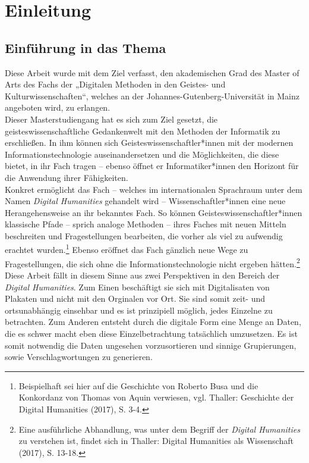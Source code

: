 \documentclass[a4paper,12pt,ngerman]{article}
\begin{document}
\newpage

\thispagestyle{empty}
\tableofcontents

\newpage

\section{Einleitung}
\subsection{Einführung in das Thema}
Diese Arbeit wurde mit dem Ziel verfasst, den akademischen Grad des Master of Arts des Fachs der „Digitalen Methoden in den Geistes- und Kulturwissenschaften“, welches an der Johannes-Gutenberg-Universität in Mainz angeboten wird, zu erlangen. \\
Dieser Masterstudiengang hat es sich zum Ziel gesetzt, die geisteswissenschaftliche Gedankenwelt mit den Methoden der Informatik zu erschließen. In ihm können sich Geisteswissenschaftler*innen mit der modernen Informationstechnologie auseinandersetzen und die Möglichkeiten, die diese bietet, in ihr Fach tragen -- ebenso öffnet er Informatiker*innen den Horizont für die Anwendung ihrer Fähigkeiten. \\
Konkret ermöglicht das Fach -- welches im internationalen Sprachraum unter dem Namen \textit{Digital Humanities} gehandelt wird -- Wissenschaftler*innen eine neue Herangehensweise an ihr bekanntes Fach.  So können Geisteswissenschaftler*innen klassische Pfade -- sprich analoge Methoden -- ihres Faches mit neuen Mitteln beschreiten und Fragestellungen bearbeiten, die vorher als viel zu aufwendig erachtet wurden.\footnote{Beispielhaft sei hier auf die Geschichte von Roberto Busa und die Konkordanz von Thomas von Aquin verwiesen, vgl. Thaller: Geschichte der Digital Humanities (2017), S. 3-4.} Ebenso eröffnet das Fach gänzlich neue Wege zu Fragestellungen, die sich ohne die Informationstechnologie nicht ergeben hätten.\footnote{Eine ausführliche Abhandlung, was unter dem Begriff der \textit{Digital Humanities} zu verstehen ist, findet sich in Thaller: Digital Humanities als Wissenschaft (2017), S. 13-18.} \\
Diese Arbeit fällt in diesem Sinne aus zwei Perspektiven in den Bereich der \textit{Digital Humanities}. Zum Einen beschäftigt sie sich mit Digitalisaten von Plakaten und nicht mit den Orginalen vor Ort. Sie sind somit zeit- und ortsunabhängig einsehbar und es ist prinzipiell möglich, jedes Einzelne zu betrachten. Zum Anderen entsteht durch die digitale Form eine Menge an Daten, die es schwer macht eben diese Einzelbetrachtung tatsächlich umzusetzen. Es ist somit notwendig die Daten ungesehen vorzusortieren und sinnige Grupierungen, sowie Verschlagwortungen zu generieren. \\
\end{document}
